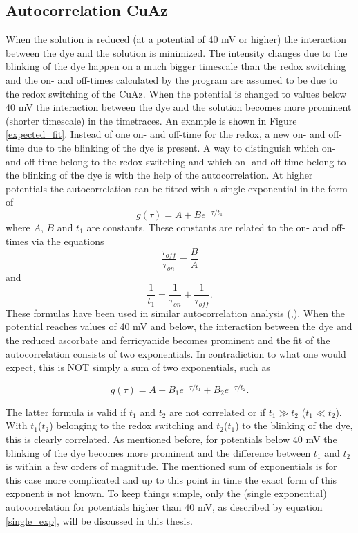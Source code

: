 \documentclass[twoside,single]{lion-msc}
\begin{document}
\subsection{Autocorrelation CuAz} \label{autocor}

When the solution is reduced (at a potential of 40 mV or higher) the interaction between the dye and the solution is minimized. The intensity changes due to the blinking of the dye happen on a much bigger timescale than the redox switching and the on- and off-times calculated by the program are assumed to be due to the redox switching of the CuAz. When the potential is changed to values below 40 mV the interaction between the dye and the solution becomes more prominent (shorter timescale) in the timetraces. An example is shown in Figure \ref{expected_fit}. Instead of one on- and off-time for the redox, a new on- and off-time due to the blinking of the dye is present. A way to distinguish which on- and off-time belong to the redox switching and which on- and off-time belong to the blinking of the dye is with the help of the autocorrelation. At higher potentials the autocorrelation can be fitted with a single exponential in the form of
\begin{equation} \label{single_exp}
g(\tau) =  A + Be^{-\tau/t_{1}}
\end{equation}
where $A$, $B$ and $t_{1}$ are constants. These constants are related to the on- and off-times via the equations
\begin{equation}\label{tau_on}
\frac{\tau_{off}}{\tau_{on}} = \frac{B}{A}
\end{equation}
and
\begin{equation}\label{tau_off}
\frac{1}{t_{1}} = \frac{1}{\tau_{on}} + \frac{1}{\tau_{off}}.
\end{equation}
These formulas have been used in similar autocorrelation analysis (\cite{Wai-TakYip1998},\cite{Vosch2007}). When the potential reaches values of 40 mV and below, the interaction between the dye and the reduced ascorbate and ferricyanide becomes prominent and the fit of the autocorrelation consists of two exponentials. In contradiction to what one would expect, this is NOT simply a sum of two exponentials, such as

\begin{equation}\label{multi_exp}
g(\tau) = A +  B_{1}e^{-\tau/t_{1}} + B_{2}e^{-\tau/t_{2}}. 
\end{equation}

The latter formula is valid if $t_{1}$ and $t_{2}$ are not correlated or if $t_{1} \gg t_{2}$ ($t_{1} \ll  t_{2}$). With $t_{1}$($t_{2}$) belonging to the redox switching and $t_{2}$($t_{1}$) to the blinking of the dye, this is clearly correlated. As mentioned before, for potentials below 40 mV the blinking of the dye becomes more prominent and the difference between $t_{1}$ and $t_{2}$ is within a few orders of magnitude. The mentioned sum of exponentials is for this case more complicated and up to this point in time the exact form of this exponent is not known. To keep things simple, only the (single exponential) autocorrelation for potentials higher than 40 mV, as described by equation \ref{single_exp}, will be discussed in this thesis.  
\end{document}
